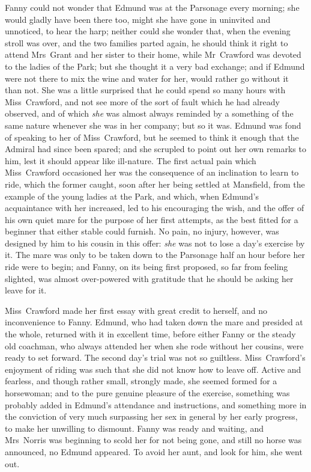 Fanny could not wonder that Edmund was at the Parsonage every morning; she would gladly have been there too, might she have gone in uninvited and unnoticed, to hear the harp; neither could she wonder that, when the evening stroll was over, and the two families parted again, he should think it right to attend Mrs~Grant and her sister to their home, while Mr~Crawford was devoted to the ladies of the Park; but she thought it a very bad exchange; and if Edmund were not there to mix the wine and water for her, would rather go without it than not. She was a little surprised that he could spend so many hours with Miss~Crawford, and not see more of the sort of fault which he had already observed, and of which \textit{she}  was almost always reminded by a something of the same nature whenever she was in her company; but so it was. Edmund was fond of speaking to her of Miss~Crawford, but he seemed to think it enough that the Admiral had since been spared; and she scrupled to point out her own remarks to him, lest it should appear like ill-nature. The first actual pain which Miss~Crawford occasioned her was the consequence of an inclination to learn to ride, which the former caught, soon after her being settled at Mansfield, from the example of the young ladies at the Park, and which, when Edmund's acquaintance with her increased, led to his encouraging the wish, and the offer of his own quiet mare for the purpose of her first attempts, as the best fitted for a beginner that either stable could furnish. No pain, no injury, however, was designed by him to his cousin in this offer: \textit{she}  was not to lose a day's exercise by it. The mare was only to be taken down to the Parsonage half an hour before her ride were to begin; and Fanny, on its being first proposed, so far from feeling slighted, was almost over-powered with gratitude that he should be asking her leave for it.

Miss~Crawford made her first essay with great credit to herself, and no inconvenience to Fanny. Edmund, who had taken down the mare and presided at the whole, returned with it in excellent time, before either Fanny or the steady old coachman, who always attended her when she rode without her cousins, were ready to set forward. The second day's trial was not so guiltless. Miss~Crawford's enjoyment of riding was such that she did not know how to leave off. Active and fearless, and though rather small, strongly made, she seemed formed for a horsewoman; and to the pure genuine pleasure of the exercise, something was probably added in Edmund's attendance and instructions, and something more in the conviction of very much surpassing her sex in general by her early progress, to make her unwilling to dismount. Fanny was ready and waiting, and Mrs~Norris was beginning to scold her for not being gone, and still no horse was announced, no Edmund appeared. To avoid her aunt, and look for him, she went out.

